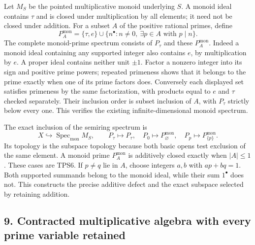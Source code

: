 \documentclass[
  10pt,
]{article}
\begin{document}
Let \(M_S\) be the pointed multiplicative monoid underlying \(S\). A
monoid ideal contains \(\tau\) and is closed under multiplication by all
elements; it need not be closed under addition. For a subset \(A\) of
the positive rational primes, define \[
P_A^{\mathrm{mon}}=\{\tau,e\}\cup
\{n^\bullet:n\ne0,\ \exists p\in A\text{ with }p\mid n\}.
\tag{TPS33}
\] The complete monoid-prime spectrum consists of \(P_\tau\) and these
\(P_A^{\mathrm{mon}}\). Indeed a monoid ideal containing any supported
integer also contains \(e\), by multiplication by \(e\). A proper ideal
contains neither unit \(\pm1\). Factor a nonzero integer into its sign
and positive prime powers; repeated primeness shows that it belongs to
the prime exactly when one of its prime factors does. Conversely each
displayed set satisfies primeness by the same factorization, with
products equal to \(e\) and \(\tau\) checked separately. Their inclusion
order is subset inclusion of \(A\), with \(P_\tau\) strictly below every
one. This verifies the existing infinite-dimensional monoid spectrum.

The exact inclusion of the semiring spectrum is \[
X\hookrightarrow\operatorname{Spec}_{\mathrm{mon}}M_S,
\qquad P_\tau\mapsto P_\tau,\quad
P_0\mapsto P_\varnothing^{\mathrm{mon}},\quad
P_p\mapsto P_{\{p\}}^{\mathrm{mon}}.
\tag{TPS34}
\] Its topology is the subspace topology because both basic opens test
exclusion of the same element. A monoid prime \(P_A^{\mathrm{mon}}\) is
additively closed exactly when \(|A|\le1\). These cases are TPS6. If
\(p\ne q\) lie in \(A\), choose integers \(a,b\) with \(ap+bq=1\). Both
supported summands belong to the monoid ideal, while their sum
\(1^\bullet\) does not. This constructs the precise additive defect and
the exact subspace selected by retaining addition.

\subsection{9. Contracted multiplicative algebra with every prime
variable
retained}\label{contracted-multiplicative-algebra-with-every-prime-variable-retained}
\end{document}
